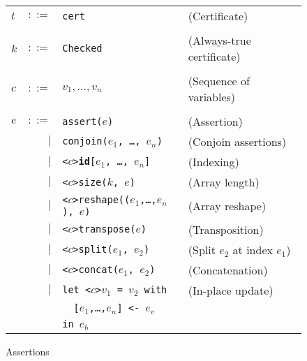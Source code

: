 \begin{figure}[bt]
\begin{tabular}{lrll}
$t$ & $::=$ & \texttt{cert} & (Certificate) \\
\\
$k$ & $::=$ & \texttt{Checked} & (Always-true certificate) \\
\\
$c$ & $::=$ & $v_1, \ldots ,v_{n}$ & (Sequence of variables) \\
\\
$e$ & $::=$ & \texttt{assert($e$)} & (Assertion) \\
& $|$ & \texttt{conjoin($e_{1}$, \ldots, $e_{n}$)} & (Conjoin assertions) \\
& $|$ & \texttt{<$c$>\textbf{id}[$e_{1}$, \ldots, $e_{n}$]} & (Indexing) \\
& $|$ & \texttt{<$c$>size($k$, $e$)} & (Array length) \\
& $|$ & \texttt{<$c$>reshape(($e_{1}$,\ldots,$e_{n}$), $e$)} & (Array reshape) \\
& $|$ & \texttt{<$c$>transpose($e$)} & (Transposition) \\
& $|$ & \texttt{<$c$>split($e_{1}$, $e_{2}$)} & (Split $e_{2}$ at index $e_{1}$) \\
& $|$ & \texttt{<$c$>concat($e_{1}$, $e_{2}$)} & (Concatenation) \\
& $|$ & \texttt{let <$c$>$v_{1}$ = $v_{2}$ with} & (In-place update) \\
&     & \texttt{\ \ [$e_{1}$,\ldots,$e_{n}$] <- $e_{v}$} \\
&     & \texttt{in $e_{b}$} \\
\end{tabular}
\caption{Assertions}
\label{fig:assertions}
\end{figure}

